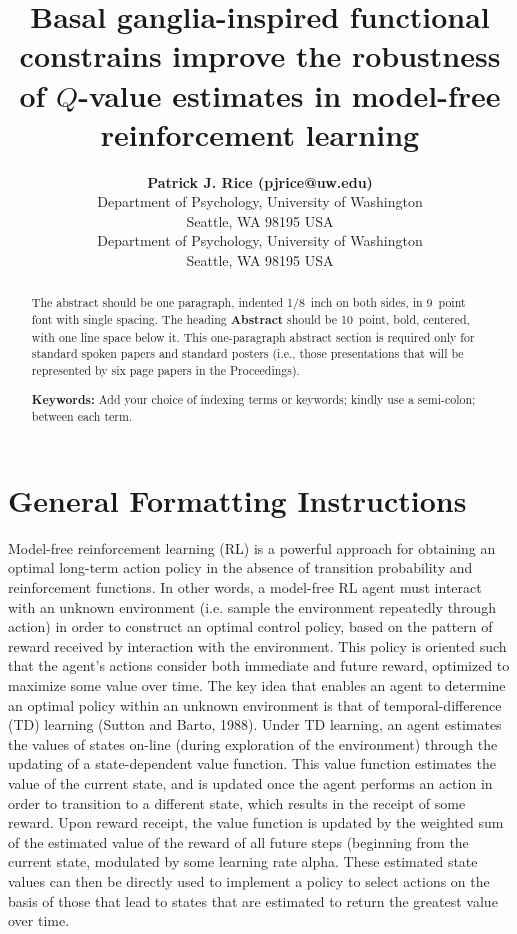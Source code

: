 \documentclass[10pt,letterpaper]{article}
\title{Basal ganglia-inspired functional constrains improve the robustness of $Q$-value estimates in model-free reinforcement learning}
\author{{\large \bf Patrick J. Rice (pjrice@uw.edu)} \\
  Department of Psychology, University of Washington \\
  Seattle, WA 98195 USA
  \AND {\large \bf Andrea Stocco (stocco@uw.edu)} \\
  Department of Psychology, University of Washington \\
  Seattle, WA 98195 USA}
\begin{document}
\maketitle


\begin{abstract}
The abstract should be one paragraph, indented 1/8~inch on both sides,
in 9~point font with single spacing. The heading {\bf Abstract} should
be 10~point, bold, centered, with one line space below it. This
one-paragraph abstract section is required only for standard spoken
papers and standard posters (i.e., those presentations that will be
represented by six page papers in the Proceedings).

\textbf{Keywords:} 
Add your choice of indexing terms or keywords; kindly use a semi-colon; between each term.
\end{abstract}


\section{General Formatting Instructions}


Model-free reinforcement learning (RL) is a powerful approach for obtaining an optimal long-term action policy 
in the absence of transition probability and reinforcement functions. 
In other words, a model-free RL agent must interact with an unknown environment (i.e. sample the environment 
repeatedly through action) in order to construct an optimal control policy, based on the pattern of 
reward received by interaction with the environment. This policy is oriented such that 
the agent’s actions consider both immediate and future reward, optimized to maximize some value over time.
The key idea that enables an agent to determine an optimal policy within an unknown environment is that
of temporal-difference (TD) learning (Sutton and Barto, 1988). Under TD learning, an agent 
estimates the values of states on-line (during exploration of the environment) through the updating
of a state-dependent value function. This value function estimates the value of the current state, 
and is updated once the agent performs an action in order to transition to a different state, which 
results in the receipt of some reward. Upon reward receipt, the value function is updated by the weighted 
sum of the estimated value of the reward of all future steps (beginning from the current state, modulated by 
some learning rate alpha. These estimated state values can then be directly used to implement a policy to 
select actions on the basis of those that lead to states that are estimated to return the greatest value over time.
\end{document}
